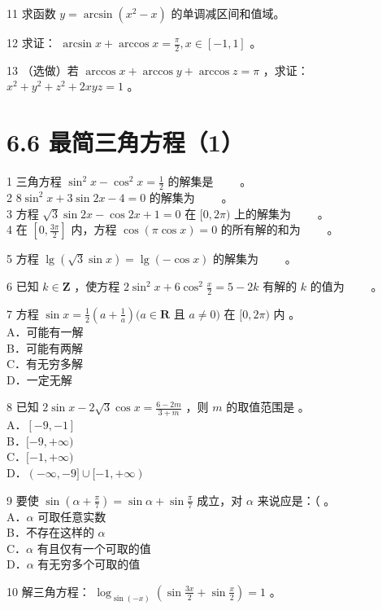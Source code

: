 \documentclass[10pt]{article}
\begin{document}
11 求函数 \(y=\arcsin \left(x^{2}-x\right)\) 的单调减区间和值域。

12 求证： \(\arcsin x+\arccos x=\frac{\pi}{2}, x \in[-1,1]\) 。

13 （选做）若 \(\arccos x+\arccos y+\arccos z=\pi\) ，求证：\(x^{2}+y^{2}+z^{2}+2 x y z=1\) 。

\section*{6.6 最简三角方程（1）}
1 三角方程 \(\sin ^{2} x-\cos ^{2} x=\frac{1}{2}\) 的解集是 \(\qquad\)。\\
2 \(8 \sin ^{2} x+3 \sin 2 x-4=0\) 的解集为 \(\qquad\)。\\
3 方程 \(\sqrt{3} \sin 2 x-\cos 2 x+1=0\) 在 \([0,2 \pi)\) 上的解集为 \(\qquad\)。\\
4 在 \(\left[0, \frac{3 \pi}{2}\right]\) 内，方程 \(\cos (\pi \cos x)=0\) 的所有解的和为 \(\qquad\)。

5 方程 \(\lg (\sqrt{3} \sin x)=\lg (-\cos x)\) 的解集为 \(\qquad\)。

6 已知 \(k \in \mathbf{Z}\) ，使方程 \(2 \sin ^{2} x+6 \cos ^{2} \frac{x}{2}=5-2 k\) 有解的 \(k\) 的值为 \(\qquad\)。

7 方程 \(\sin x=\frac{1}{2}\left(a+\frac{1}{a}\right)(a \in \mathbf{R}\) 且 \(a \neq 0)\) 在 \([0,2 \pi)\) 内 。\\
A．可能有一解\\
B．可能有两解\\
C．有无穷多解\\
D．一定无解

8 已知 \(2 \sin x-2 \sqrt{3} \cos x=\frac{6-2 m}{3+m}\) ，则 \(m\) 的取值范围是 。\\
A．\([-9,-1]\)\\
B．\([-9,+\infty)\)\\
C．\([-1,+\infty)\)\\
D．\((-\infty,-9] \cup[-1,+\infty)\)

9 要使 \(\sin \left(\alpha+\frac{\pi}{7}\right)=\sin \alpha+\sin \frac{\pi}{7}\) 成立，对 \(\alpha\) 来说应是：（ 。\\
A．\(\alpha\) 可取任意实数\\
B．不存在这样的 \(\alpha\)\\
C．\(\alpha\) 有且仅有一个可取的值\\
D．\(\alpha\) 有无穷多个可取的值

10 解三角方程： \(\log _{\sin (-x)}\left(\sin \frac{3 x}{2}+\sin \frac{x}{2}\right)=1\) 。
\end{document}
